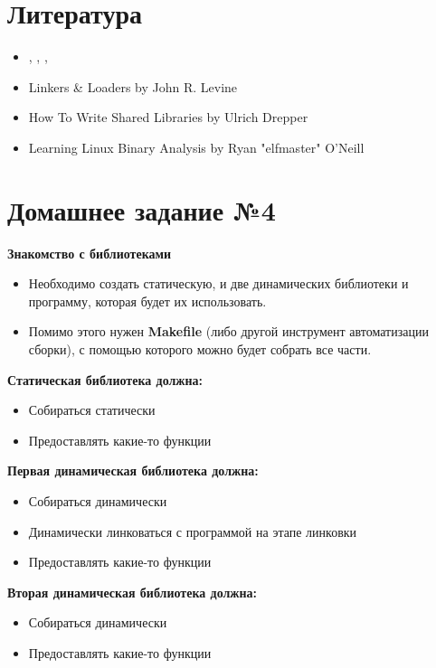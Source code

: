 \documentclass[../../lectures.tex]{subfiles}
\begin{document}
\newpage
\section{Литература}
\begin{itemize}
    \item {}, , , 
    \item Linkers \& Loaders by John R. Levine
    \item How To Write Shared Libraries by Ulrich Drepper
    \item Learning Linux Binary Analysis by Ryan "elfmaster" O'Neill
\end{itemize}

\section{Домашнее задание №4}
\textbf{Знакомство с библиотеками}
\begin{itemize}
    \item Необходимо создать статическую, и две динамических библиотеки и программу, которая будет их использовать.
    \item Помимо этого нужен \textbf{Makefile} (либо другой инструмент автоматизации сборки), с помощью которого можно будет собрать все части.
\end{itemize}

\textbf{Статическая библиотека должна:}
\begin{itemize}
    \item Собираться статически
    \item Предоставлять какие-то функции
\end{itemize}

\textbf{Первая динамическая библиотека должна:}
\begin{itemize}
    \item Собираться динамически
    \item Динамически линковаться с программой на этапе линковки
    \item Предоставлять какие-то функции
\end{itemize}

\textbf{Вторая динамическая библиотека должна:}
\begin{itemize}
    \item Собираться динамически
    \item Предоставлять какие-то функции
\end{itemize}
\end{document}
